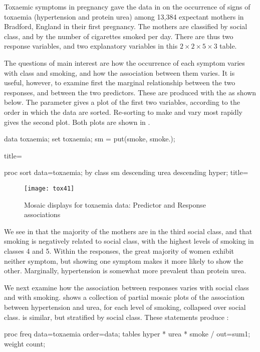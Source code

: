 \begin{Example}[toxaemia]{Toxaemic symptoms in pregnancy}
\citet{Brown-etal:83} gave the data in 
on the occurrence of signs of toxaemia (hypertension and protein urea)
among 13,384 expectant mothers in Bradford, England in their first pregnancy.
The mothers are classified by social class, and by the
number of cigarettes smoked per day.
There are thus two response variables, and two explanatory variables
in this $2 \times 2 \times 5 \times 3$ table.


The questions of main interest are how the occurrence of each symptom
varies with class and smoking, and how the association between them
varies. It is useful, however, to examine first the marginal relationship between
the two responses, and between the two predictors.
These are produced with the  as shown below.
The parameter  gives a plot of the first two variables,
according to the order in which the data are sorted.
Re-sorting to make  and  vary most rapidly
gives the second plot.  Both plots are shown in .
\begin{listing}

data toxaemia;
   set toxaemia;
   sm = put(smoke, smoke.);

   title=%

proc sort data=toxaemia;
   by class sm descending urea descending hyper;
   title=%
\end{listing}

\begin{figure}[htb]
  \centering
  \texttt{[image: tox41]}
  \caption{Mosaic displays for toxaemia data: Predictor and Response associations}%
  \label{fig:tox41}
\end{figure}
We see in  that the majority of the mothers are in the
third social class, and that smoking is negatively related to social
class, with the highest levels of smoking in classes 4 and 5.
Within the responses, the great majority of women exhibit neither symptom,
but showing one symptom makes it more likely to show the other.
Marginally, hypertension is somewhat more prevalent than protein urea.

We next examine how the association between responses varies with
social class and with smoking.
  shows a collection of partial
mosaic plots of the association between hypertension and urea,
for each level of smoking, collapsed over social class.
 is similar, but stratified by social class.
These statements produce :
\begin{listing}
proc freq data=toxaemia order=data;
   tables hyper * urea * smoke / out=sum1;
   weight count;
\end{listing}


\end{Example}
